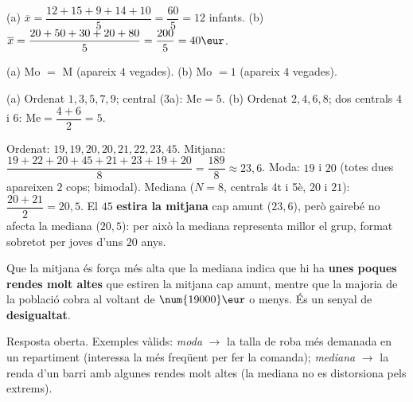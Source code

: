 \begin{solucions}
\begin{sollist}
  \item (a) $\overline{x}=\dfrac{12+15+9+14+10}{5}=\dfrac{60}{5}=12$ infants. \quad
        (b) $\overline{x}=\dfrac{20+50+30+20+80}{5}=\dfrac{200}{5}=40\eur$.
  \item (a) Mo $=$ M (apareix $4$ vegades). \quad
        (b) Mo $=1$ (apareix $4$ vegades).
  \item (a) Ordenat $1,3,5,7,9$; central (3a): $\text{Me}=5$. \quad
        (b) Ordenat $2,4,6,8$; dos centrals $4$ i $6$:
        $\text{Me}=\dfrac{4+6}{2}=5$.
  \item Ordenat: $19,19,20,20,21,22,23,45$. Mitjana:
        $\dfrac{19+22+20+45+21+23+19+20}{8}=\dfrac{189}{8}\approx 23,6$. Moda: $19$ i
        $20$ (totes dues apareixen $2$ cops; bimodal). Mediana ($N=8$, centrals 4t i
        5è, $20$ i $21$): $\dfrac{20+21}{2}=20,5$. El $45$ \textbf{estira la mitjana}
        cap amunt ($23,6$), però gairebé no afecta la mediana ($20,5$): per això la
        mediana representa millor el grup, format sobretot per joves d'uns $20$ anys.
  \item Que la mitjana és força més alta que la mediana indica que hi ha \textbf{unes
        poques rendes molt altes} que estiren la mitjana cap amunt, mentre que la
        majoria de la població cobra al voltant de $\num{19000}\eur$ o menys. És un
        senyal de \textbf{desigualtat}.
  \item Resposta oberta. Exemples vàlids: \emph{moda} $\rightarrow$ la talla de roba
        més demanada en un repartiment (interessa la més freqüent per fer la comanda);
        \emph{mediana} $\rightarrow$ la renda d'un barri amb algunes rendes molt altes
        (la mediana no es distorsiona pels extrems).
\end{sollist}
\end{solucions}
